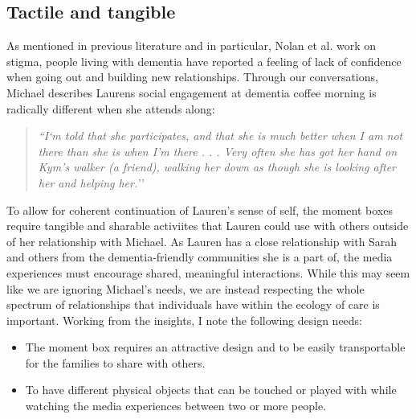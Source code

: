 \subsection{Tactile and tangible}
\label{DR:TactileTangible}
As mentioned in previous literature and in particular, Nolan et al. work on stigma, people living with dementia have reported a feeling of lack of confidence when going out and building new relationships. Through our conversations, Michael describes Laurens social engagement at dementia coffee morning is radically different when she attends along:
\begin{quote}
\textit{    ``I`m told that she participates, and that she is much better when I am not there than she is when I’m there . . . Very often she has got her hand on Kym’s walker (a friend), walking her down as though she is looking after her and helping her.''
}
\end{quote}

To allow for coherent continuation of Lauren’s sense of self, the moment boxes require tangible and sharable activiites that Lauren could use with others outside of her relationship with Michael. As Lauren has a close relationship with Sarah and others from the dementia-friendly communities she is a part of, the media experiences must encourage shared, meaningful interactions. While this may seem like we are ignoring Michael’s needs, we are instead respecting the whole spectrum of relationships that individuals have within the ecology of care is important. Working from the insights, I note the following design needs:
\begin{itemize}
    \item The moment box requires an attractive design and to be easily transportable for the families to share with others.
    \item To have different physical objects that can be touched or played with while watching the media experiences between two or more people. 
\end{itemize}

